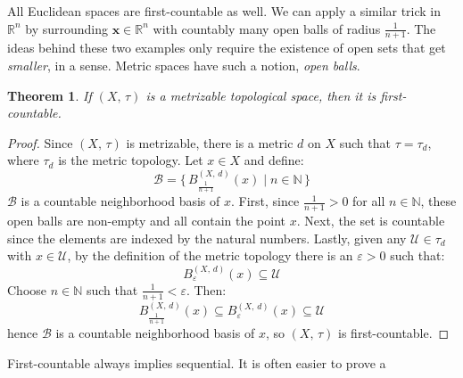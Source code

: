 \documentclass{article}
\theoremstyle{plain}
\newtheorem{theorem}{Theorem}[section]
\theoremstyle{normal}
\newenvironment{example}{%
    \pushQED{\qed}\renewcommand{\qedsymbol}{$\blacksquare$}\examplex%
}{%
    \popQED\endexamplex%
}
\begin{document}
        \begin{example}
            All Euclidean spaces are first-countable as well. We can apply a
            similar trick in $\mathbb{R}^{n}$ by surrounding
            $\mathbf{x}\in\mathbb{R}^{n}$ with countably many open balls of
            radius $\frac{1}{n+1}$.
        \end{example}
        The ideas behind these two examples only require the existence of
        open sets that get \textit{smaller}, in a sense. Metric spaces have
        such a notion, \textit{open balls}.
        \begin{theorem}
            If $(X,\,\tau)$ is a metrizable topological space, then
            it is first-countable.
        \end{theorem}
        \begin{proof}
            Since $(X,\,\tau)$ is metrizable, there is a metric $d$ on $X$ such
            that $\tau=\tau_{d}$, where $\tau_{d}$ is the metric topology. Let
            $x\in{X}$ and define:
            \begin{equation}
                \mathcal{B}=\{\,B_{\frac{1}{n+1}}^{(X,\,d)}(x)\;|\;
                    n\in\mathbb{N}\,\}
            \end{equation}
            $\mathcal{B}$ is a countable neighborhood basis of $x$. First, since
            $\frac{1}{n+1}>0$ for all $n\in\mathbb{N}$, these open balls are
            non-empty and all contain the point $x$. Next, the set is countable
            since the elements are indexed by the natural numbers. Lastly,
            given any $\mathcal{U}\in\tau_{d}$ with $x\in\mathcal{U}$, by the
            definition of the metric topology there is an
            $\varepsilon>0$ such that:
            \begin{equation}
                B_{\varepsilon}^{(X,\,d)}(x)\subseteq\mathcal{U}
            \end{equation} 
            Choose $n\in\mathbb{N}$ such that $\frac{1}{n+1}<\varepsilon$. Then:
            \begin{equation}
                B_{\frac{1}{n+1}}^{(X,\,d)}(x)
                \subseteq{B}_{\varepsilon}^{(X,\,d)}(x)
                \subseteq\mathcal{U}
            \end{equation}
            hence $\mathcal{B}$ is a countable neighborhood basis of $x$,
            so $(X,\,\tau)$ is first-countable.
        \end{proof}
        First-countable always implies sequential. It is often easier to prove a
\end{document}
